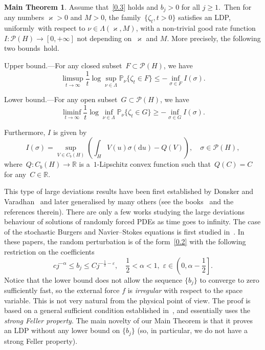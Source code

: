 \documentclass[10pt]{amsart}
\theoremstyle{definition}\newtheorem{defi}[theo]{Definition}\newtheorem{rema}[theo]{Remark}\newtheorem{exam}[theo]{Example}\newtheorem{exem}[theo]{Example}\newtheorem{nota}[theo]{Notation}
\newcommand{\e}{\varepsilon}
\newcommand{\R}{{\mathbb R}}
\newcommand{\pP}{{\mathbb P}}
\newcommand{\PP}{{\mathcal P}}
\newcommand{\vk}{{\varkappa}}
\newcommand{\ty}{\infty}
\newcommand{\dd}{\mathrm{d}}
\newtheorem*{mtheorem}{Main Theorem}
\providecommand{\pointir}{.\enspace---\enspace}
\begin{document}
\begin{mtheorem}
Assume that~\eqref{0.3} holds and $b_j>0$ for all $j\ge1$.~Then for any numbers $\vk>0$ and $M>0$, the family~$\{\zeta_t,t>0\}$ satisfies an LDP, uniformly~with respect to $\nu\in\Lambda(\varkappa,M)$, with a non-trivial good rate function $I: \PP(H)\to [0,+\ty]$ not depending on~$\vk$ and $M$. More precisely, the following two bounds~hold.

Upper bound\pointir For any closed subset~$F\subset\PP(H)$, we have
\[
\limsup_{t\to\infty} \frac1t\log \sup_{\nu\in\Lambda} \pP_\nu\{\zeta_t\in F\}\le -\inf_{\sigma\in F} I(\sigma).
\]

Lower bound\pointir For any open subset~$G\subset\PP(H)$, we have
\[
\liminf_{t\to\infty} \frac1t\log \inf_{\nu\in\Lambda}\pP_\nu\{\zeta_t\in G\}\ge -\inf_{\sigma\in G}I(\sigma).
\]

Furthermore, $I$ is given by
\begin{equation}\label{E:II}
I(\sigma)=\sup_{V\in C_b(H)} \left(\int_H V(u)\sigma(\dd u)-Q(V) \right),
\quad \sigma\in\PP(H),
\end{equation}
where~$Q:C_b(H)\to\R$ is a~$1$-Lipschitz convex function such that~$Q(C)=C$ for any~$C\in\R$.
\end{mtheorem}

This type of large deviations results have been first established by Donsker and Varadhan~\cite{DV-1975} and later generalised by many others (see the books~\cite{FW1984,DS1989,ADOZ00} and the references therein). There are only a few works studying the large deviations behaviour of solutions of randomly forced PDEs as time goes to infinity. The case of the stochastic Burgers and Navier--Stokes equations is first studied in~\cite{gourcy-2007b, gourcy-2007a}. In these papers, the random perturbation is of the form~\eqref{0.2} with the following restriction on the coefficients
\begin{equation}\label{Gougz}
cj^{-\alpha}\le b_j\le Cj^{-\frac12-\e}, \quad \frac12<\alpha<1,\,\, \e\in \left(0, \alpha-\frac12\right].
\end{equation}
Notice that the lower bound does not allow the sequence $\{b_j\}$ to converge to zero sufficiently fast, so the external force $f$ is \emph{irregular} with respect to the space variable. This is not very natural from the physical point of view. The proof is based on a general sufficient condition established in~\cite{wu-2001}, and essentially uses the \emph{strong Feller property}. The main novelty of our Main Theorem is that it proves an LDP without any lower bound on $\{b_j\}$ (so, in particular, we do not have a strong Feller property).
\end{document}
